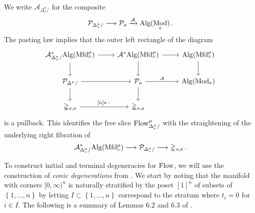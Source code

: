 \documentclass[10pt]{amsart}
\numberwithin{equation}{section}
\theoremstyle{definition}
\DeclareMathOperator{\Mod}{Mod}
\newcommand{\PreFlow}{\mathrm{Flow}\vphantom{w}}
\newcommand{\Mfd}{\mathrm{Mfd}\vphantom{d}}
\newcommand{\Alg}{\mathrm{Alg}\vphantom{z}}
\newcommand{\Simp}{\mathbb{\Delta}}
\newcommand{\cA}{\mathcal{A}}
\newcommand{\cP}{\mathcal{P}}
\newcommand{\join}{\star}
\renewcommand{\to}{\mathchoice{\longrightarrow}{\rightarrow}{}{}}
\begin{document}
We write $\cA_{\Delta^{n}_{s}/}$ for the composite
\begin{align*}
	\cP_{\Delta^{n}_{s}/} \to \cP_{a} \xrightarrow{\cA} \Alg(\Mod_{\diamond}) \,.
\end{align*}
The pasting law implies that the outer left rectangle of the diagram
\begin{equation*}
	\begin{tikzcd}
		\cA_{\Delta^{n}_{s}/}^{*}\Alg(\Mfd^{\mu}_{\diamond}) \arrow[r] \arrow[d]  &
		\cA^{*}\Alg(\Mfd^{\mu}_{\diamond})  \arrow[d] \arrow[r] &
		\Alg(\Mfd^{\mu}_{\diamond}) \arrow[d] \\
		\cP_{\Delta^{n}/} \arrow[r] \arrow[d] &
		\cP_{a} \arrow[r, "\cA"] \arrow[d] &
		\Alg(\Mod_{\diamond}) \\
		\Simp_{s,a} \arrow[r, "{[n]\join -}"] &
		\Simp_{s,a}
	\end{tikzcd}
\end{equation*}
is a pullback.
This identifies the free slice $\PreFlow^{\mu}_{\Delta^{n}_{s}/}$ with the straightening of the underlying right fibration of
\begin{align*}
	\cA_{\Delta^{n}_{s}/}^{*}\Alg(\Mfd^{\mu}_{\diamond}) \to \cP_{\Delta^{n}_{s}/} \to \Simp_{s,a} \,.
\end{align*}

To construct initial and terminal degeneracies for $\PreFlow$, we will use the construction of \emph{conic degenerations} from \cite[Section 6.1]{AB}.
We start by noting that the manifold with corners $[0,\infty)^{n}$ is naturally stratified by the poset $[1]^{n}$ of subsets of $\left\{ 1,\dots , n\right\}$ by letting $I\subset \left\{ 1,\dots,n\right\}$ correspond to the stratum where $t_{i} =0 $ for $i\in I$.
The following is a summary of Lemmas 6.2 and 6.3 of \cite{AB}.
\end{document}
